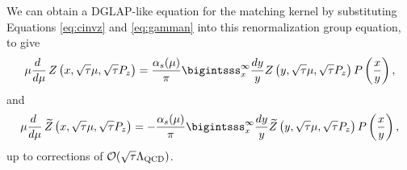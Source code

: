 We can obtain a DGLAP-like equation for the matching kernel by substituting 
Equations \eqref{eq:cinvz} and \eqref{eq:gamman} into this renormalization 
group equation, to give
\begin{equation}\label{eq:dglapz1}
 \mu\frac{d\;}{d\mu}\,Z\left(x,\sqrt{\tau}\mu, \sqrt{\tau}P_z\right) =  
\frac{\alpha_s(\mu)}{\pi} \bigintsss_{x}^\infty \frac{dy}{y}  
Z\left(y,\sqrt{\tau}\mu, \sqrt{\tau}P_z\right) P\left(\frac{x}{y}\right),
\end{equation}
and
\begin{equation}
 \mu\frac{d\;}{d\mu}\,\widetilde{Z}\left(x,\sqrt{\tau}\mu, \sqrt{\tau}P_z\right) =  -
\frac{\alpha_s(\mu)}{\pi} \bigintsss_{x}^\infty \frac{dy}{y}  
\widetilde{Z}\left(y,\sqrt{\tau}\mu, \sqrt{\tau}P_z\right) P\left(\frac{x}{y}\right),
\end{equation}
up to corrections of ${\cal O}(\sqrt{\tau}\Lambda_{\mathrm{QCD}})$.

